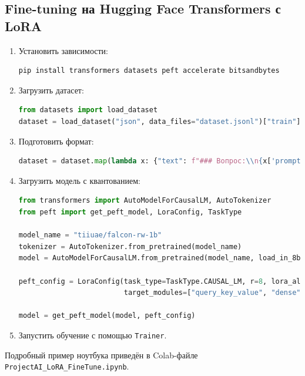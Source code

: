 \documentclass[12pt]{article}
\begin{document}
\subsection*{Fine-tuning на Hugging Face Transformers с LoRA}

\begin{enumerate}
    \item Установить зависимости:
    \begin{lstlisting}[language=Python]
pip install transformers datasets peft accelerate bitsandbytes
    \end{lstlisting}

    \item Загрузить датасет:
    \begin{lstlisting}[language=Python]
from datasets import load_dataset
dataset = load_dataset("json", data_files="dataset.jsonl")["train"]
    \end{lstlisting}

    \item Подготовить формат:
    \begin{lstlisting}[language=Python]
dataset = dataset.map(lambda x: {"text": f"### Вопрос:\\n{x['prompt']}\\n\\n### Ответ:\\n{x['response']}"})
    \end{lstlisting}

    \item Загрузить модель с квантованием:
    \begin{lstlisting}[language=Python]
from transformers import AutoModelForCausalLM, AutoTokenizer
from peft import get_peft_model, LoraConfig, TaskType

model_name = "tiiuae/falcon-rw-1b"
tokenizer = AutoTokenizer.from_pretrained(model_name)
model = AutoModelForCausalLM.from_pretrained(model_name, load_in_8bit=True)

peft_config = LoraConfig(task_type=TaskType.CAUSAL_LM, r=8, lora_alpha=16,
                         target_modules=["query_key_value", "dense"], lora_dropout=0.1)

model = get_peft_model(model, peft_config)
    \end{lstlisting}

    \item Запустить обучение с помощью \texttt{Trainer}.
\end{enumerate}
Подробный пример ноутбука приведён в Colab-файле \texttt{ProjectAI\_LoRA\_FineTune.ipynb}.
\end{document}
